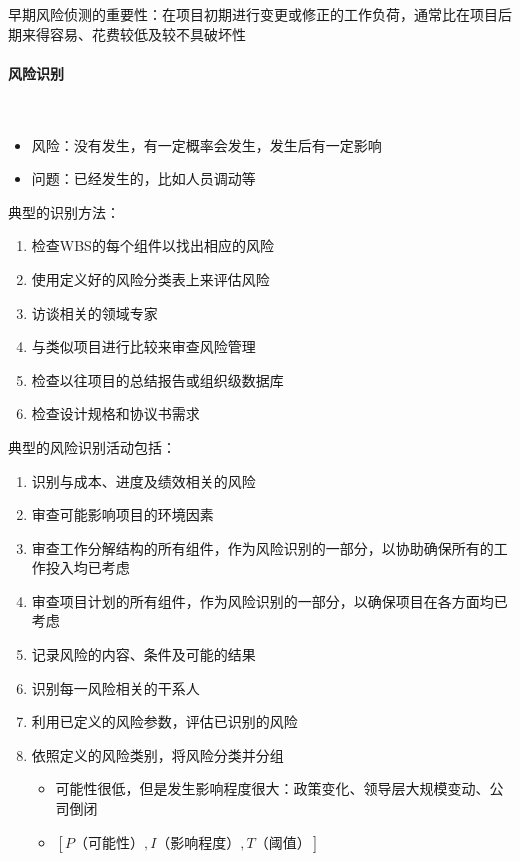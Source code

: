 早期风险侦测的重要性：在项目初期进行变更或修正的工作负荷，通常比在项目后期来得容易、花费较低及较不具破坏性

\paragraph{风险识别}~{} \par
\begin{itemize}
    \item 风险：没有发生，有一定概率会发生，发生后有一定影响
    \item 问题：已经发生的，比如人员调动等
\end{itemize}

典型的识别方法：
\vspace{-0.8em}
\begin{multicols}{2}
    \begin{enumerate}[label=\arabic*.]
        \item 检查WBS的每个组件以找出相应的风险
        \item 使用定义好的风险分类表上来评估风险
        \item 访谈相关的领域专家
        \item 与类似项目进行比较来审查风险管理
        \item 检查以往项目的总结报告或组织级数据库
        \item 检查设计规格和协议书需求
    \end{enumerate}
\end{multicols}
\vspace{-1em}

典型的风险识别活动包括：
\vspace{-0.8em}
\begin{multicols}{2}
    \begin{enumerate}[label=\arabic*.]
        \item 识别与成本、进度及绩效相关的风险
        \item 审查可能影响项目的环境因素
        \item 审查工作分解结构的所有组件，作为风险识别的一部分，以协助确保所有的工作投入均已考虑
        \item 审查项目计划的所有组件，作为风险识别的一部分，以确保项目在各方面均已考虑
        \item 记录风险的内容、条件及可能的结果
        \item 识别每一风险相关的干系人
        \item 利用已定义的风险参数，评估已识别的风险
        \item 依照定义的风险类别，将风险分类并分组
        \begin{itemize}
            \item 可能性很低，但是发生影响程度很大：政策变化、领导层大规模变动、公司倒闭
            \item $[P\mbox{（可能性）}, I\mbox{（影响程度）}, T\mbox{（阈值）}]$
        \end{itemize}
    \end{enumerate}
\end{multicols}
\vspace{-1em}


